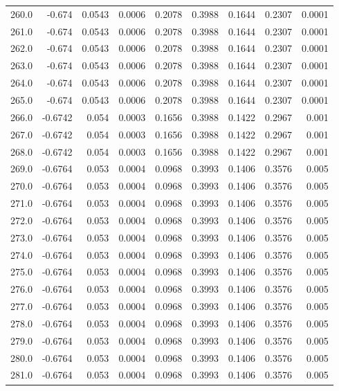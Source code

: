 \begin{longtable}{lrrrrrrrr}
260.0 & -0.674 & 0.0543 & 0.0006 & 0.2078 & 0.3988 & 0.1644 & 0.2307 & 0.0001 \\
261.0 & -0.674 & 0.0543 & 0.0006 & 0.2078 & 0.3988 & 0.1644 & 0.2307 & 0.0001 \\
262.0 & -0.674 & 0.0543 & 0.0006 & 0.2078 & 0.3988 & 0.1644 & 0.2307 & 0.0001 \\
263.0 & -0.674 & 0.0543 & 0.0006 & 0.2078 & 0.3988 & 0.1644 & 0.2307 & 0.0001 \\
264.0 & -0.674 & 0.0543 & 0.0006 & 0.2078 & 0.3988 & 0.1644 & 0.2307 & 0.0001 \\
265.0 & -0.674 & 0.0543 & 0.0006 & 0.2078 & 0.3988 & 0.1644 & 0.2307 & 0.0001 \\
266.0 & -0.6742 & 0.054 & 0.0003 & 0.1656 & 0.3988 & 0.1422 & 0.2967 & 0.001 \\
267.0 & -0.6742 & 0.054 & 0.0003 & 0.1656 & 0.3988 & 0.1422 & 0.2967 & 0.001 \\
268.0 & -0.6742 & 0.054 & 0.0003 & 0.1656 & 0.3988 & 0.1422 & 0.2967 & 0.001 \\
269.0 & -0.6764 & 0.053 & 0.0004 & 0.0968 & 0.3993 & 0.1406 & 0.3576 & 0.005 \\
270.0 & -0.6764 & 0.053 & 0.0004 & 0.0968 & 0.3993 & 0.1406 & 0.3576 & 0.005 \\
271.0 & -0.6764 & 0.053 & 0.0004 & 0.0968 & 0.3993 & 0.1406 & 0.3576 & 0.005 \\
272.0 & -0.6764 & 0.053 & 0.0004 & 0.0968 & 0.3993 & 0.1406 & 0.3576 & 0.005 \\
273.0 & -0.6764 & 0.053 & 0.0004 & 0.0968 & 0.3993 & 0.1406 & 0.3576 & 0.005 \\
274.0 & -0.6764 & 0.053 & 0.0004 & 0.0968 & 0.3993 & 0.1406 & 0.3576 & 0.005 \\
275.0 & -0.6764 & 0.053 & 0.0004 & 0.0968 & 0.3993 & 0.1406 & 0.3576 & 0.005 \\
276.0 & -0.6764 & 0.053 & 0.0004 & 0.0968 & 0.3993 & 0.1406 & 0.3576 & 0.005 \\
277.0 & -0.6764 & 0.053 & 0.0004 & 0.0968 & 0.3993 & 0.1406 & 0.3576 & 0.005 \\
278.0 & -0.6764 & 0.053 & 0.0004 & 0.0968 & 0.3993 & 0.1406 & 0.3576 & 0.005 \\
279.0 & -0.6764 & 0.053 & 0.0004 & 0.0968 & 0.3993 & 0.1406 & 0.3576 & 0.005 \\
280.0 & -0.6764 & 0.053 & 0.0004 & 0.0968 & 0.3993 & 0.1406 & 0.3576 & 0.005 \\
281.0 & -0.6764 & 0.053 & 0.0004 & 0.0968 & 0.3993 & 0.1406 & 0.3576 & 0.005 \\

\end{longtable}
